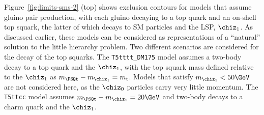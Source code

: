 Figure~\ref{fig:limits-sms-2} (top) shows exclusion contours for
models that assume gluino pair production, with each gluino decaying
to a top quark and an on-shell top squark, the latter of which decays
to SM particles and the LSP, $\chiz_1$. As discussed earlier, these
models can be considered as representations of a ``natural'' solution
to the little hierarchy problem. Two different scenarios are
considered for the decay of the top squarks. The
\texttt{T5tttt\_DM175} model assumes a two-body decay to a top quark
and the $\chiz_1$, with the top squark mass defined relative to the
$\chiz_1$ as $m_{\PSQt} - m_{\chiz_1} = m_\text{t}$. Models that
satisfy $m_{\chiz_1} < 50\GeV$ are not considered here, as the
$\chiz_0$ particles carry very little momentum.  The \texttt{T5ttcc}
model assumes $m_{\PSQt} - m_{\chiz_1} = 20\GeV$ and two-body decays
to a charm quark and the $\chiz_1$. 


